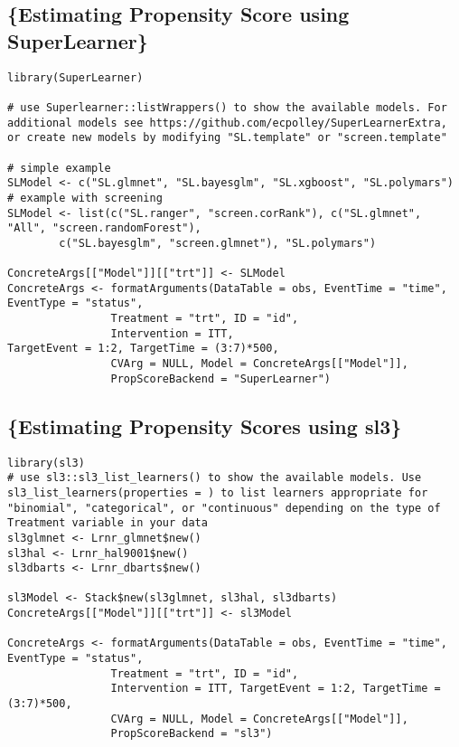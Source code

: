 \documentclass{report}
\newcommand{\1}{\ensuremath{\mathbf{1}}}
\begin{document}
\subsection{\{Estimating Propensity Score using SuperLearner\}}
\label{sec:org09edb08}


\begin{lstlisting}
library(SuperLearner)

# use Superlearner::listWrappers() to show the available models. For additional models see https://github.com/ecpolley/SuperLearnerExtra, or create new models by modifying "SL.template" or "screen.template"

# simple example
SLModel <- c("SL.glmnet", "SL.bayesglm", "SL.xgboost", "SL.polymars")
# example with screening
SLModel <- list(c("SL.ranger", "screen.corRank"), c("SL.glmnet", "All", "screen.randomForest"), 
		c("SL.bayesglm", "screen.glmnet"), "SL.polymars")

ConcreteArgs[["Model"]][["trt"]] <- SLModel
ConcreteArgs <- formatArguments(DataTable = obs, EventTime = "time", EventType = "status", 
				Treatment = "trt", ID = "id", 
				Intervention = ITT,
TargetEvent = 1:2, TargetTime = (3:7)*500, 
				CVArg = NULL, Model = ConcreteArgs[["Model"]], 
				PropScoreBackend = "SuperLearner")
\end{lstlisting}

\subsection{\{Estimating Propensity Scores using sl3\}}
\label{sec:org8c8da69}

\begin{lstlisting}
library(sl3)
# use sl3::sl3_list_learners() to show the available models. Use sl3_list_learners(properties = ) to list learners appropriate for "binomial", "categorical", or "continuous" depending on the type of Treatment variable in your data
sl3glmnet <- Lrnr_glmnet$new()
sl3hal <- Lrnr_hal9001$new()
sl3dbarts <- Lrnr_dbarts$new()

sl3Model <- Stack$new(sl3glmnet, sl3hal, sl3dbarts)
ConcreteArgs[["Model"]][["trt"]] <- sl3Model

ConcreteArgs <- formatArguments(DataTable = obs, EventTime = "time", EventType = "status", 
				Treatment = "trt", ID = "id", 
				Intervention = ITT, TargetEvent = 1:2, TargetTime = (3:7)*500, 
				CVArg = NULL, Model = ConcreteArgs[["Model"]], 
				PropScoreBackend = "sl3")
\end{lstlisting}
\end{document}
